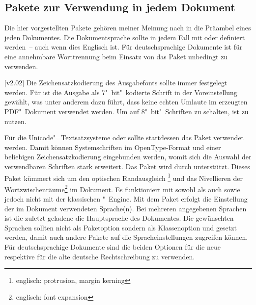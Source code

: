 \subsection{Pakete zur Verwendung in jedem Dokument}
%
Die hier vorgestellten Pakete gehören meiner Meinung nach in die Präambel eines 
jeden Dokumentes. Die Dokumentsprache sollte in jedem Fall mit  
oder  definiert werden~-- auch wenn dies Englisch ist. Für 
deutschsprachige Dokumente ist für eine annehmbare Worttrennung beim Einsatz 
von  das Paket  unbedingt zu verwenden.

\begin{DeclarePackages}
[v2.02]
  Die Zeichensatzkodierung des Ausgabefonts sollte immer festgelegt werden. Für 
   ist die Ausgabe als 7"~bit"~kodierte Schrift in der 
  Voreinstellung gewählt, was unter anderem dazu führt, dass keine echten
  Umlaute im erzeugten PDF"~Dokument verwendet werden. Um auf 8"~bit"~Schriften
  zu schalten, ist  zu nutzen.
  
  Für die Unicode"=Textsatzsysteme  oder  
  sollte stattdessen das Paket  verwendet werden. Damit 
  können Systemschriften im OpenType-Format und einer beliebigen 
  Zeichensatzkodierung eingebunden werden, womit sich die Auswahl der 
  verwendbaren Schriften stark erweitert. Das Paket wird durch \TUDScript 
  unterstützt.
  Dieses Paket kümmert sich um den optischen Randausgleich%
  \footnote{englisch: protrusion, margin kerning} und das Nivellieren der 
  Wortzwischenräume\footnote{englisch: font expansion} im Dokument. Es 
  funktioniert mit sowohl  als auch  sowie 
   jedoch nicht mit der klassischen "~Engine.
  Mit dem Paket  erfolgt die Einstellung der im Dokument 
  verwendeten Sprache(n). Bei mehreren angegebenen Sprachen ist die zuletzt 
  geladene die Hauptsprache des Dokumentes. Die gewünschten Sprachen sollten 
  nicht als Paketoption sondern als Klassenoption und gesetzt werden, damit 
  auch andere Pakete auf die Spracheinstellungen zugreifen können. Für 
  deutschsprachige Dokumente sind die beiden Optionen  für die 
  neue respektive  für die alte deutsche Rechtschreibung zu 
  verwenden. 
  

\end{DeclarePackages}

